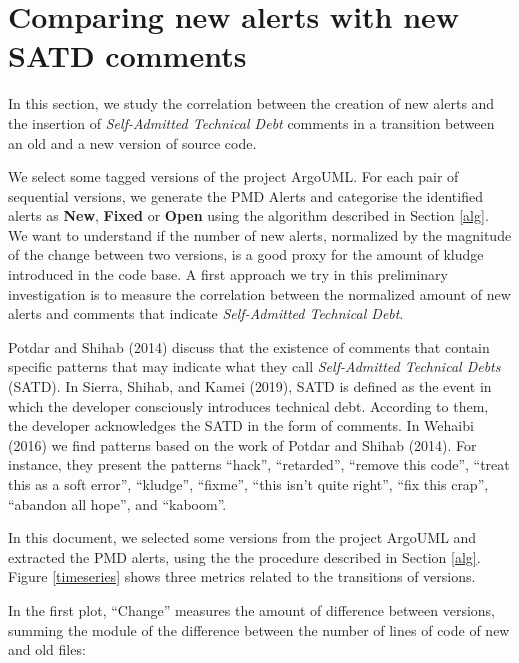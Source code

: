 \documentclass[
]{article}
\begin{document}
\normalsize

\section{Comparing new alerts with new SATD comments}\label{results}

In this section, we study the correlation between the creation of new
alerts and the insertion of \textit{Self-Admitted Technical Debt} comments in
a transition between an old and a new version of source code.

We select some tagged versions of the project ArgoUML. For each pair of
sequential versions, we generate the PMD Alerts and categorise the identified alerts as
\textbf{New}, \textbf{Fixed} or \textbf{Open} using the algorithm described in Section \ref{alg}.
We want to understand if the number of new alerts, normalized by the
magnitude of the change between two versions, is a good proxy
for the amount of kludge introduced in the code base. A first approach
we try in this preliminary investigation is to measure the correlation
between the normalized amount of new alerts and comments that indicate
\textit{Self-Admitted Technical Debt}.

%
%

Potdar and Shihab (2014) discuss that the existence of
comments that contain specific patterns that may indicate what they call
\textit{Self-Admitted Technical Debts} (SATD). In Sierra, Shihab, and Kamei
(2019), SATD is defined as the event in which
the developer consciously introduces technical debt. According to them,
the developer acknowledges the SATD in the form of comments. In Wehaibi
(2016) we find patterns based on the work of Potdar and Shihab (2014).
For instance, they present the patterns ``hack'', ``retarded'',
``remove this code'', ``treat this as a soft error'', ``kludge'',
``fixme'', ``this isn't quite right'', ``fix this crap'', ``abandon all
hope'', and ``kaboom''.

In this document, we selected some versions from the project ArgoUML and
extracted the PMD alerts, using the the procedure described in Section
\ref{alg}. Figure \ref{timeseries} shows three metrics related to the
transitions of versions.

%
%

In the first plot, ``Change'' measures the amount of difference
between versions, summing the module of the difference between the
number of lines of code of new and old files:
\end{document}
